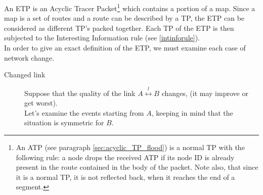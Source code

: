 \documentclass[a4paper]{article}
\begin{document}
An ETP is an Acyclic Tracer Packet\footnote{
An ATP (see paragraph \ref{sec:acyclic_TP_flood}) is a normal TP with the following
rule: a node drops the received ATP if its node ID is already present in the route
contained in the body of the packet. Note also, that since it is a normal TP,
it is not reflected back, when it reaches the end of a segment.}
which contains a portion of a map. Since a map is a set of routes and a
route can be described by a TP, the ETP can be considered as different TP's packed together.
Each TP of the ETP is then subjected to the Interesting Information rule (see
\ref{intinforule}).\\

In order to give an exact definition of the ETP, we must examine each case of network change.
\begin{description}
	\item[Changed link]
		\label{ilink}
		Suppose that the quality of the link $A
		\stackrel{l}{\leftrightarrow} B$ changes, (it may improve or get worst).\\
		Let's examine the events starting from $A$, keeping in mind
		that the situation is symmetric for $B$.


\end{description}
\end{document}
